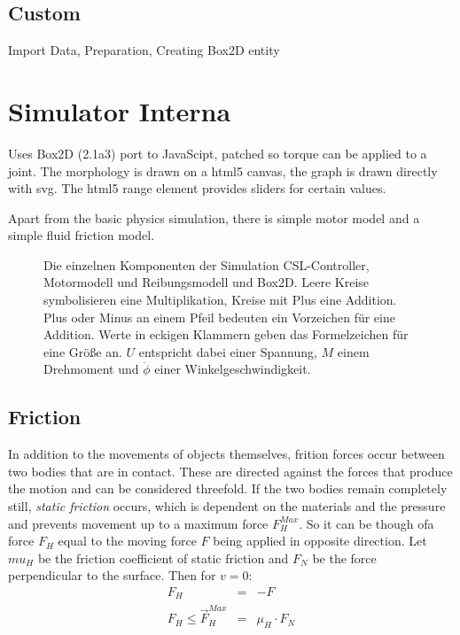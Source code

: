 \documentclass[10pt,a4paper]{article}
\begin{document}
\subsection{Custom}

Import Data, Preparation, Creating Box2D entity

\section{Simulator Interna}
\label{sim_internal}

Uses Box2D (2.1a3) port to JavaScipt, patched so torque can be applied to a joint.
The morphology is drawn on a html5 canvas, the graph is drawn directly with svg.
The html5 range element provides sliders for certain values.

Apart from the basic physics simulation, there is simple motor model and a simple fluid friction model.

\begin{figure}[H]
    \centering
    
    \caption{Die einzelnen Komponenten der Simulation CSL-Controller, Motormodell und
    Reibungsmodell und Box2D. Leere Kreise symbolisieren eine Multiplikation, Kreise mit Plus
    eine Addition. Plus oder Minus an einem Pfeil bedeuten ein Vorzeichen für eine Addition.
    Werte in eckigen Klammern geben das Formelzeichen für eine Größe an. $U$ entspricht dabei
    einer Spannung, $M$ einem Drehmoment und $\dot{\phi}$ einer Winkelgeschwindigkeit.}
    \label{fig:controllermodell}
\end{figure}

\subsection{Friction}

In addition to the movements of objects themselves, frition forces occur between two bodies that are in contact. These are directed against the forces that produce the motion and can be considered threefold.
If the two bodies remain completely still, \textit{static friction} occurs, which is dependent on the materials and the pressure and prevents movement up to a maximum force $F_H^{Max}$.
So it can be though ofa force $F_H$ equal to the moving force $F$ being applied in opposite direction.
Let $mu_H$ be the friction coefficient of static friction and $F_N$ be the force perpendicular to the
surface. Then for $v = 0$:
\begin{eqnarray}
    F_H & = & -F \\
    F_H \le \vec F_H^{Max} & = & \mu_H \cdot F_N
\end{eqnarray}
\end{document}
